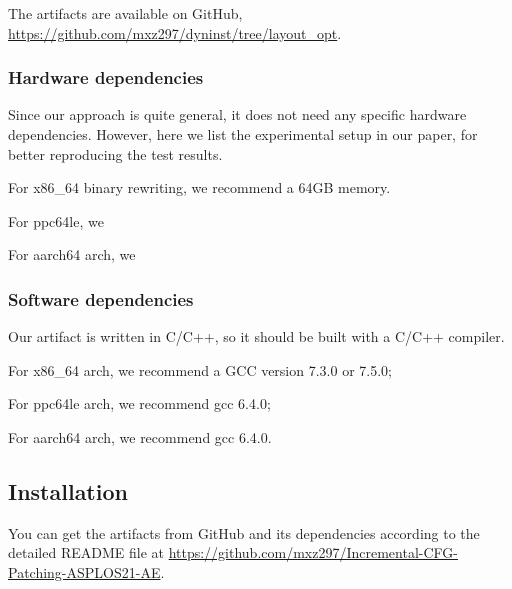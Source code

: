 \documentclass{sigplanconf}
\begin{document}
{The artifacts are available on GitHub, \url{https://github.com/mxz297/dyninst/tree/layout_opt}.


\subsubsection{Hardware dependencies}

Since our approach is quite general, it does not need any specific hardware dependencies. 
However, here we list the experimental setup in our paper, for better reproducing the test results.

For x86\_64 binary rewriting, we recommend a 64GB memory.

For ppc64le, we

For aarch64 arch, we

\subsubsection{Software dependencies}

Our artifact is written in C/C++, so it should be built with a C/C++ compiler.

For x86\_64 arch, we recommend a GCC version 7.3.0 or 7.5.0;

For ppc64le arch, we recommend gcc 6.4.0; 

For aarch64 arch, we recommend gcc 6.4.0.




\subsection{Installation}


You can get the artifacts from GitHub and its dependencies according to the detailed README file at
\url{https://github.com/mxz297/Incremental-CFG-Patching-ASPLOS21-AE}.






}
\end{document}
